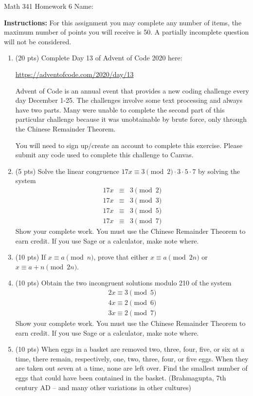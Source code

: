 \documentclass[12pt]{article}
\begin{document}
	Math 341 Homework 6
	\hfill
	Name: \underline{\hspace*{2in}}
	
	\textbf{Instructions:} For this assignment you may complete any number of items, the maximum number of points you will receive is 50. A partially incomplete question will not be considered.
\begin{enumerate}
	\item (20 pts) Complete Day 13 of Advent of Code 2020 here:
			 \begin{center}
			 	\url{https://adventofcode.com/2020/day/13}
			 \end{center}
		Advent of Code is an annual event that provides a new coding challenge every day December 1-25. The challenges involve some text processing and always have two parts.
		Many were unable to complete the second part of this particular challenge because it was unobtainable by brute force, only through the Chinese Remainder Theorem.
		
		You will need to sign up/create an account to complete this exercise. Please submit any code used to complete this challenge to Canvas.
		
	\item (5 pts) Solve the linear congruence $17x\equiv 3\pmod 2\cdot3\cdot 5\cdot 7$ by solving the system
		\begin{eqnarray*}
			17x&\equiv& 3\pmod 2\\
			17x&\equiv& 3\pmod 3\\
			17x&\equiv& 3\pmod 5\\
			17x&\equiv& 3\pmod 7
		\end{eqnarray*}
		Show your complete work. You must use the Chinese Remainder Theorem to earn credit. If you use Sage or a calculator, make note where.
		\vfill
		\newpage
	\item (10 pts) If $x\equiv a\pmod n$, prove that either $x\equiv a \pmod{2n}$ or $x\equiv a+n\pmod{2n}$.
		\vfill
	\item (10 pts) Obtain the two incongruent solutions modulo 210 of the system
	\begin{eqnarray*}
		2x\equiv 3\pmod 5\\4x\equiv 2\pmod 6\\3x\equiv 2\pmod 7
	\end{eqnarray*}
		Show your complete work. You must use the Chinese Remainder Theorem to earn credit. If you use Sage or a calculator, make note where.
		\vfill
		\newpage
	\item (10 pts) When eggs in a basket are removed two, three, four, five, or six at a time, there remain, respectively, one, two, three, four, or five eggs. When they are taken out seven at a time, none are left over. Find the smallest number of eggs that could have been contained in the basket. (Brahmagupta, 7th century AD – and many other variations in other cultures)
	

\end{enumerate}
\end{document}
